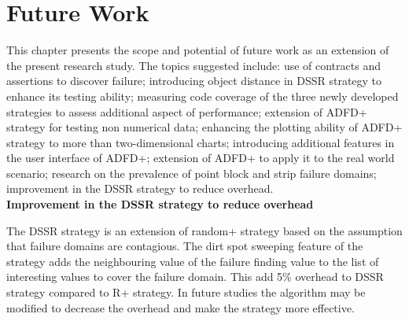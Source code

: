 
\chapter{Future Work}
\label{chap:futureWork}
	
This chapter presents the scope and potential of future work as an extension of the present research study. The topics suggested include: use of contracts and assertions to discover failure; introducing object distance in DSSR strategy to enhance its testing ability; measuring code coverage of the three newly developed strategies to assess additional aspect of performance; extension of ADFD+ strategy for testing non numerical data; enhancing the plotting ability of ADFD+ strategy to more than two-dimensional charts; introducing additional features in the user interface of ADFD+; extension of ADFD+ to apply it to the real world scenario; research on the prevalence of point block and strip failure domains; improvement in the DSSR strategy to reduce overhead. \\

	


\textbf{Improvement in the DSSR strategy to reduce overhead}

The DSSR strategy is an extension of random+ strategy based on the assumption that failure domains are contagious. The dirt spot sweeping feature of the strategy adds the neighbouring value of the failure finding value to the list of interesting values to cover the failure domain. This add 5\% overhead to DSSR strategy compared to R+ strategy. In future studies the algorithm may be modified to decrease the overhead and make the strategy more effective.\\

